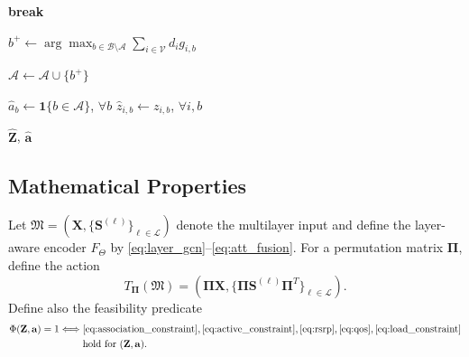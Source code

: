 \documentclass[journal]{IEEEtran}
\begin{document}
\begin{algorithm}[!t]
\begin{algorithmic}[1]
        \State \textbf{break}
    \EndIf

    \State $b^{+}\gets
    \arg\max_{b\in\mathcal{B}\setminus\mathcal{A}}
    \sum_{i\in\mathcal{V}}d_i g_{i,b}$

    \State $\mathcal{A}\gets\mathcal{A}\cup\{b^{+}\}$


\State $\widehat{a}_b\gets\mathbf{1}\{b\in\mathcal{A}\}$, $\forall b$
\State $\widehat{z}_{i,b}\gets z_{i,b}$, $\forall i,b$

\State \Return $\widehat{\mathbf{Z}}$, $\widehat{\mathbf{a}}$
\end{algorithmic}
\end{algorithm}

\subsection{Mathematical Properties}
Let $\mathfrak{M}=(\mathbf{X},\{\mathbf{S}^{(\ell)}\}_{\ell\in\mathcal{L}})$
denote the multilayer input and define the layer-aware encoder
$F_{\Theta}$ by \eqref{eq:layer_gcn}--\eqref{eq:att_fusion}. For a permutation
matrix $\boldsymbol{\Pi}$, define the action
\begin{equation}
    T_{\boldsymbol{\Pi}}(\mathfrak{M}) =
    \left(\boldsymbol{\Pi}\mathbf{X},
    \{\boldsymbol{\Pi}\mathbf{S}^{(\ell)}
    \boldsymbol{\Pi}^{T}\}_{\ell\in\mathcal{L}}\right).
\end{equation}
Define also the feasibility predicate
\begin{equation}
\begin{split}
    \Phi(\mathbf{Z},\mathbf{a})=1
    \Longleftrightarrow\;&
    \eqref{eq:association_constraint},\eqref{eq:active_constraint},
    \eqref{eq:rsrp},\eqref{eq:qos},\eqref{eq:load_constraint}\\
    &\text{hold for }(\mathbf{Z},\mathbf{a}).
\end{split}
\end{equation}
\end{document}
